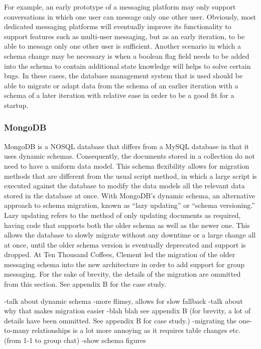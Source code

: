 \documentclass[12pt]{article}
\begin{document}
For example, an early prototype of a messaging platform may only support conversations in which one user can message only one other user. Obviously, most dedicated messaging platforms will eventually improve its functionality to support features such as multi-user messaging, but as an early iteration, to be able to message only one other user is sufficient. Another scenario in which a schema change may be necessary is when a boolean flag field needs to be added into the schema to contain additional state knowledge will helps to solve certain bugs. In these cases, the database management system that is used should be able to migrate or adapt data from the schema of an earlier iteration with a schema of a later iteration with relative ease in order to be a good fit for a startup.

\subsubsection{MongoDB}
MongoDB is a NOSQL database that differs from a MySQL database in that it uses dynamic schemas. Consequently, the documents stored in a collection do not need to have a uniform data model. This schema flexibility allows for migration methods that are different from the usual script method, in which a large script is executed against the database to modify the data models all the relevant data stored in the database at once. With MongoDB's dynamic schema, an alternative approach to schema migration, known as ``lazy updating'' or ``schema versioning.'' Lazy updating refers to the method of only updating documents as required, having code that supports both the older schema as well as the newer one. This allows the database to slowly migrate without any downtime or a large change all at once, until the older schema version is eventually deprecated and support is dropped. At Ten Thousand Coffees, Clement led the migration of the older messaging schema into the new architecture in order to add support for group messaging. For the sake of brevity, the details of the migration are ommitted from this section. See appendix B for the case study.

-talk about dynamic schema
-more flimsy, allows for slow fallback
-talk about why that makes migration easier
-blah blah see appendix B (for brevity, a lot of details have been ommitted. See appendix B for case study.) -migrating the one-to-many relationships is a lot more annoying as it requires table changes etc. (from 1-1 to group chat)
-show schema figures
\end{document}
